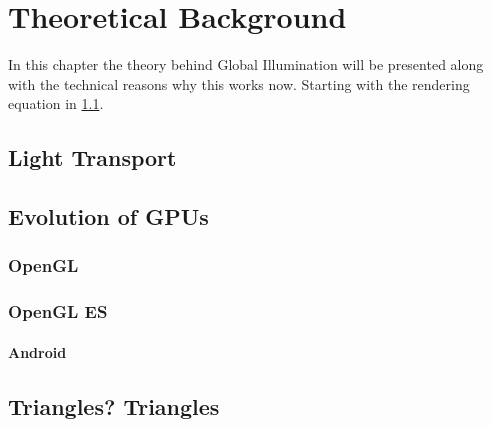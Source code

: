 \chapter{Theoretical Background}\label{cha:theory}

In this chapter the theory behind Global Illumination will be presented along with the technical reasons why this works now. Starting with the rendering equation in \ref{sec:light}. 

\section{Light Transport}\label{sec:light}



\section{Evolution of GPUs}\label{sec:gpuevo}

\subsection{OpenGL}\label{sec:ogl}

\subsection{OpenGL ES}\label{sec:ogles}

\subsubsection{Android}\label{sec:android}








\section{Triangles? Triangles}

